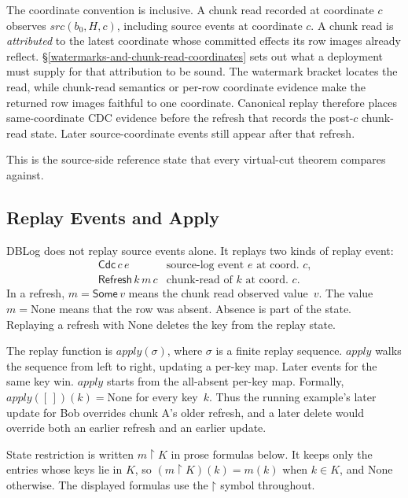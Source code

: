 \documentclass[letterpaper,10pt,twocolumn]{article}
\newcommand{\restrict}{\mathbin{\upharpoonright}}
\newcommand{\Apply}{\mathit{apply}}
\newcommand{\Src}{\mathit{src}}
\newcommand{\None}{\mathrm{None}}
\begin{document}
The coordinate convention is inclusive. A chunk read recorded at
coordinate $c$ observes $\Src(b_0,H,c)$, including
source events at coordinate $c$. A chunk read is \emph{attributed} to
the latest coordinate
whose committed effects its row images already reflect.
\S\ref{watermarks-and-chunk-read-coordinates} sets out what a deployment
must supply for that attribution to be sound. The watermark bracket
locates the read, while chunk-read semantics or per-row
coordinate evidence make the returned row images faithful to one
coordinate. Canonical replay therefore
places same-coordinate CDC evidence before the refresh that records the
post-$c$ chunk-read state. Later source-coordinate events still
appear after that refresh.

This is the source-side reference state that every virtual-cut theorem
compares against.

\subsection{Replay Events and Apply}\label{replay-events-and-apply}

DBLog does not replay source events alone. It replays two kinds of
replay event:
\[
  \begin{array}{ll}
    \mathsf{Cdc}\,c\,e & \text{source-log event $e$ at coord.\ $c$,}\\
    \mathsf{Refresh}\,k\,m\,c & \text{chunk-read of $k$ at coord.\ $c$.}
  \end{array}
\]
In a refresh, $m = \mathsf{Some}\,v$ means the chunk read observed
value~$v$. The value $m = \None$ means that the row was absent.
Absence is part of the state. Replaying a refresh
with $\None$ deletes the key from the replay state.

The replay function is $\Apply(\sigma)$, where $\sigma$ is a finite
replay sequence. $\Apply$ walks the sequence from left to right,
updating a per-key map. Later events
for the same key win. $\Apply$ starts from the all-absent per-key
map. Formally, $\Apply([\,])(k) = \None$ for every key~$k$. Thus the running
example's later update for Bob overrides chunk A's older refresh, and
a later delete would override both an earlier refresh and an earlier
update.

State restriction is written $m \restrict K$ in prose formulas
below. It keeps only the entries whose keys lie in $K$, so
$(m \restrict K)(k) = m(k)$ when $k \in K$, and
$\None$ otherwise. The displayed formulas use the
$\restrict$ symbol throughout.
\end{document}
